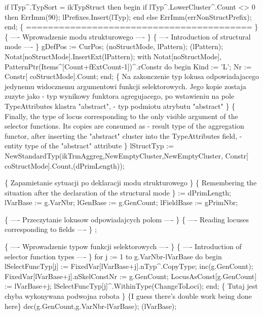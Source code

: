       if lTyp^.TypSort = ikTypStruct then
      begin
         if lTyp^.LowerCluster^.Count <> 0 then
            ErrImm(90);
         lPrefixes.Insert(lTyp);
      end
      else ErrImm(errNonStructPrefix);
   end;
   \{ ========================================= \}
   \{ ---- Wprowadzenie modu strukturowego ---- \}
   \{ ---- Introduction of structural mode ---- \}
   gDefPos := CurPos;
   (noStructMode, lPattern);
   (lPattern);
   Notat[noStructMode].InsertExt(lPattern);
   with Notat[noStructMode], PatternPtr(Items^[Count+fExtCount-1])^.rConstr do
   begin Kind := 'L'; Nr :=  Constr[ coStructMode].Count; end;
   \{ Na zakonczenie typ lokusa odpowiadajacego jedynemu widocznemu
     argumentowi funkcji selektorowych. Jego kopie zostaja zuzyte
     jako
     - typ wynikowy funktora agregujacego, po wstawieniu na pole
     TypeAttributes klastra "abstract",
     - typ podmiotu atrybutu "abstract"
   \}
   \{ Finally, the type of locus corresponding to the only visible
     argument of the selector functions. Its copies are consumed as
     - result type of the aggregation functor, after inserting the
       "abstract" cluster into the TypeAttributes field,
     - entity type of the "abstract" attribute
   \}
   lStructTyp := NewStandardTyp(ikTrmAggreg,NewEmptyCluster,NewEmptyCluster,
                                Constr[ coStructMode].Count,(dPrimLength));

   \{ Zapamietanie sytuacji po deklaracji modu strukturowego \}
   \{ Remembering the situation after the declaration of the structural mode \}
    := dPrimLength;
   lVarBase := g.VarNbr;
   lGenBase := g.GenCount;
   lFieldBase := gPrimNbr;
   
   \{ ---- Przeczytanie lokusow odpowiadajcych polom ---- \}
   \{ ---- Reading locuses corresponding to fields ---- \}
   ;
   
   \{ ---- Wprowadzenie typow funkcji selektorowych ---- \}
   \{ ---- Introduction of selector function types ---- \}
   for j := 1 to g.VarNbr-lVarBase do
   begin
      lSelectFuncTyp[j] := FixedVar[lVarBase+j].nTyp^.CopyType;
      inc(g.GenCount);
      FixedVar[lVarBase+j].nSkelConstNr := g.GenCount;
      LocusAsConst[g.GenCount] := lVarBase+j;
      lSelectFuncTyp[j]^.WithinType(ChangeToLoci);
   end;
   \{ Tutaj jest chyba wykonywana podwojna robota \}
   \{I guess there's double work being done here\}
   dec(g.GenCount,g.VarNbr-lVarBase);
   (lVarBase);
   
